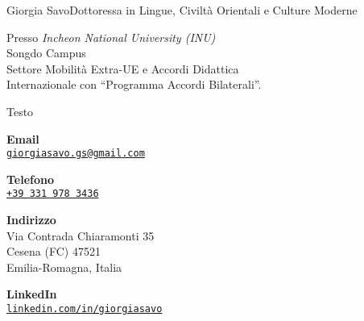 \documentclass{article}
\begin{document}
\begin{cv}[avatar]{Giorgia Savo}{Dottoressa in Lingue, Civiltà Orientali e Culture Moderne}

\begin{cvevent}[Marzo 2022][Luglio 2022]
    Presso \textit{Incheon National University (INU)}\\ Songdo Campus\\
    Settore Mobilità Extra-UE e Accordi Didattica\\
    Internazionale con “Programma Accordi Bilaterali”.
\end{cvevent}

\cvseparator[2]
\begin{cvevent}[2014]
	Testo
\end{cvevent}

\cvsidebar %



\begin{cvitem}[Envelope][4]
    \textbf{Email}\\
    \href{mailto:}{\texttt{giorgiasavo.gs@gmail.com}}
\end{cvitem}

\cvseparator[3]
\begin{cvitem}[Phone][5]
    \textbf{Telefono}\\
    \href{tel:+393319783436}{\texttt{+39 331 978 3436}}
\end{cvitem}

\cvseparator[3]
\begin{cvitem}[Home][5]
    \textbf{Indirizzo}\\
    Via Contrada Chiaramonti 35\\ Cesena (FC) 47521\\ Emilia-Romagna, Italia
\end{cvitem}

\cvseparator[3]
\begin{cvitem}[Linkedin][5]
	\textbf{LinkedIn}\\
	\href{www.linkedin.com/in/giorgiasavo}{\texttt{linkedin.com/in/giorgiasavo}}
\end{cvitem}




\end{cv}
\end{document}
